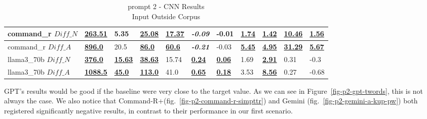 \documentclass[runningheads,a4paper,11pt]{article}
\begin{document}
\begin{table}[!ht]
{\begin{tabular}{lllllllllll}
            command\_r $Diff\_N$  & \textbf{\underline{263.51}}  & 5.35                       & \textbf{\underline{25.08}}  & \textbf{\underline{17.37}} & \textbf{\textit{-0.09}}   & -0.01                     & \textbf{\underline{1.74}} & \textbf{\underline{1.42}} & \textbf{\underline{10.46}} & \textbf{\underline{1.56}} \\ \midrule
            command\_r $Diff\_A$  & \textbf{\underline{896.0}}   & 20.5                       & \textbf{\underline{86.0}}   & \textbf{\underline{60.6}}  & \textbf{\textit{-0.21}}   & -0.03                     & \textbf{\underline{5.45}} & \textbf{\underline{4.95}} & \textbf{\underline{31.29}} & \textbf{\underline{5.67}} \\ \midrule
            llama3\_70b $Diff\_N$ & \textbf{\underline{376.0}}   & \textbf{\underline{15.63}} & \textbf{\underline{38.63}}  & 15.74                      & \textbf{\underline{0.24}} & \textbf{\underline{0.06}} & 1.69                      & \textbf{\underline{2.91}} & 0.31                       & -0.3                      \\ \midrule
            llama3\_70b $Diff\_A$ & \textbf{\underline{1088.5}}  & \textbf{\underline{45.0}}  & \textbf{\underline{113.0}}  & 41.0                       & \textbf{\underline{0.65}} & \textbf{\underline{0.18}} & 3.53                      & \textbf{\underline{8.56}} & 0.27                       & -0.68                     \\ \bottomrule
        \end{tabular}%
    }
    \caption{prompt 2 - CNN Results\\Input Outside Corpus}
    \label{table-prompt-2-cnn-dailymail}
\end{table}

GPT's results would be good if the baseline were very close to the target value.
As we can see in Figure~\ref{fig-p2-gpt-twords}, this is not always the case.
We also notice that Command-R+(fig.~\ref{fig-p2-command-r-simpttr}) and Gemini
(fig.~\ref{fig-p2-gemini-a-kup-pw}) both registered significantly negative
results, in contrast to their performance in our first scenario.
\end{document}
